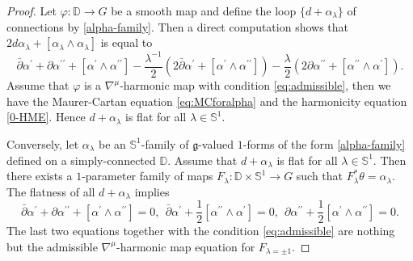 \documentclass[12pt]{amsart}
\theoremstyle{definition}
\theoremstyle{remark}
\numberwithin{equation}{section}
\begin{document}
\begin{proof}
 Let $\varphi:\mathbb{D}\to G$ be a smooth map and define the 
 loop $\{d+\alpha_\lambda\}$ of connections by \eqref{alpha-family}. 
 Then a direct computation shows that $2 d\alpha_{\lambda}+[\alpha_{\lambda}\wedge \alpha_{\lambda}]$
 is equal to 
\begin{equation*}
 \bar{\partial}\alpha^{\prime}+\partial\alpha^{\prime
\prime}+[\alpha^{\prime}\wedge \alpha^{\prime\prime}]
-\frac{\lambda^{-1}}{2}\left(2 \bar{\partial}\alpha^{\prime}+
[\alpha^{\prime}\wedge \alpha^{\prime\prime}]\right)
-\frac{\lambda}{2} 
\left(2 \partial\alpha^{\prime\prime}+
[\alpha^{\prime\prime}\wedge \alpha^{\prime}]\right).
\end{equation*}
 Assume that $\varphi$ is a ${\nabla^{\mu}}$-harmonic map with condition \eqref{eq:admissible}, 
 then we have the Maurer-Cartan equation \eqref{eq:MCforalpha} 
 and the harmonicity equation \eqref{0-HME}.
 Hence $d+\alpha_{\lambda}$ is flat for all $\lambda \in \mathbb S^1$.

 Conversely, let $\alpha_{\lambda}$ be an 
 $\mathbb{S}^1$-family of $\mathfrak{g}$-valued
 $1$-forms of the form \eqref{alpha-family} defined on a 
 simply-connected $\mathbb{D}$. 
 Assume that $d+\alpha_{\lambda}$ is 
 flat for all $\lambda \in \mathbb{S}^1$. 
 Then there exists a $1$-parameter family of maps
 $F_{\lambda}:\mathbb{D}\times \mathbb{S}^1\to G$ such that 
 $F_{\lambda}^{*}\theta=\alpha_\lambda$. 
 The flatness of all $d+\alpha_\lambda$ implies
\begin{equation*}
 \bar{\partial}\alpha^{\prime}+\partial\alpha^{\prime \prime} 
 +[\alpha^{\prime} \wedge \alpha^{\prime \prime}]=0,
\ \
\bar \partial \alpha^{\prime}+\frac{1}{2}[\alpha^{\prime \prime} 
 \wedge \alpha^{\prime}]=0,
\ \
\partial \alpha^{\prime \prime}+\frac{1}{2}[\alpha^{\prime} 
 \wedge \alpha^{\prime \prime}]=0.
\end{equation*}
 The last two equations together with the condition \eqref{eq:admissible} 
 are nothing but the admissible ${\nabla^{\mu}}$-harmonic map equation for $F_{\lambda =\pm 1}$.
\end{proof}
\end{document}
